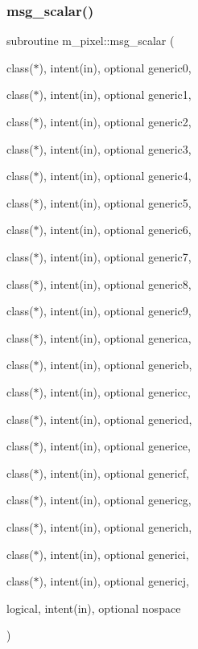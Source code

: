 \subsubsection{\texorpdfstring{msg\+\_\+scalar()}{msg\_scalar()}}
{\footnotesize\ttfamily subroutine m\+\_\+pixel\+::msg\+\_\+scalar (\begin{DoxyParamCaption}\item[{class($\ast$), intent(in), optional}]{generic0,  }\item[{class($\ast$), intent(in), optional}]{generic1,  }\item[{class($\ast$), intent(in), optional}]{generic2,  }\item[{class($\ast$), intent(in), optional}]{generic3,  }\item[{class($\ast$), intent(in), optional}]{generic4,  }\item[{class($\ast$), intent(in), optional}]{generic5,  }\item[{class($\ast$), intent(in), optional}]{generic6,  }\item[{class($\ast$), intent(in), optional}]{generic7,  }\item[{class($\ast$), intent(in), optional}]{generic8,  }\item[{class($\ast$), intent(in), optional}]{generic9,  }\item[{class($\ast$), intent(in), optional}]{generica,  }\item[{class($\ast$), intent(in), optional}]{genericb,  }\item[{class($\ast$), intent(in), optional}]{genericc,  }\item[{class($\ast$), intent(in), optional}]{genericd,  }\item[{class($\ast$), intent(in), optional}]{generice,  }\item[{class($\ast$), intent(in), optional}]{genericf,  }\item[{class($\ast$), intent(in), optional}]{genericg,  }\item[{class($\ast$), intent(in), optional}]{generich,  }\item[{class($\ast$), intent(in), optional}]{generici,  }\item[{class($\ast$), intent(in), optional}]{genericj,  }\item[{logical, intent(in), optional}]{nospace }\end{DoxyParamCaption})\hspace{0.3cm}{\ttfamily [private]}}



